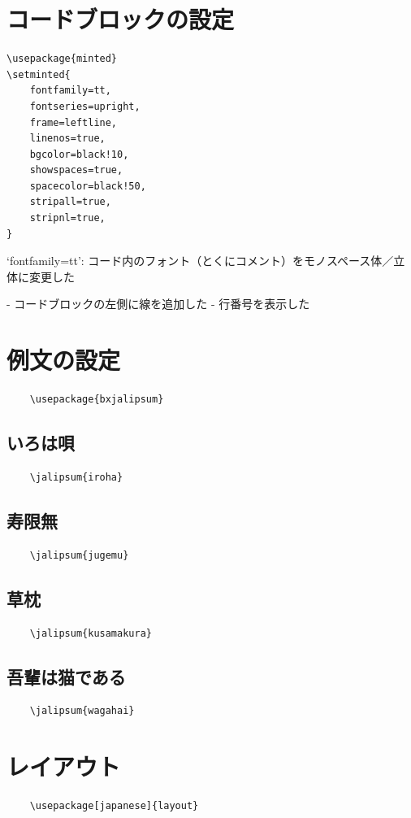 \documentclass[article, head_space=25truemm, foot_space=15truemm, gutter=15truemm]{jlreq}
\begin{document}
\section{コードブロックの設定}

\begin{verbatim}
\usepackage{minted}
\setminted{
    fontfamily=tt,
    fontseries=upright,
    frame=leftline,
    linenos=true,
    bgcolor=black!10,
    showspaces=true,
    spacecolor=black!50,
    stripall=true,
    stripnl=true,
}
\end{verbatim}

\begin{markdown}
`fontfamily=tt':
コード内のフォント（とくにコメント）をモノスペース体／立体に変更した

- コードブロックの左側に線を追加した
- 行番号を表示した
\end{markdown}

\section{例文の設定}

\begin{verbatim}
    \usepackage{bxjalipsum}
\end{verbatim}

\subsection{いろは唄}

\begin{verbatim}
    \jalipsum{iroha}
\end{verbatim}

\subsection{寿限無}

\begin{verbatim}
    \jalipsum{jugemu}
\end{verbatim}

\subsection{草枕}

\begin{verbatim}
    \jalipsum{kusamakura}
\end{verbatim}


\subsection{吾輩は猫である}

\begin{verbatim}
    \jalipsum{wagahai}
\end{verbatim}


\section{レイアウト}

\begin{verbatim}
    \usepackage[japanese]{layout}
\end{verbatim}

\layout

\printbibliography[title={参考文献}]
\end{document}
